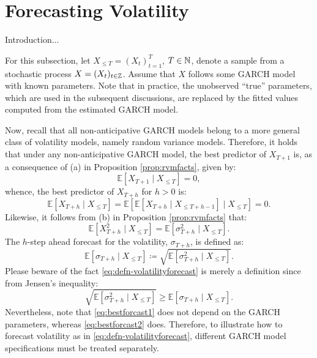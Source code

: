 \section{Forecasting Volatility}
Introduction... %

For this subsection, let $X_{\leq T}=(X_{t})_{t=1}^{T}$, $T\in\mathbb{N}$, denote a sample from a stochastic process $X=(X_{t})_{t\in\mathbb{Z}}$. Assume that $X$ follows some GARCH model with known parameters. Note that in practice, the unobserved ``true'' parameters, which are used in the subsequent discussions, are replaced by the fitted values computed from the estimated GARCH model.

Now, recall that all non-anticipative GARCH models belong to a more general class of volatility models, namely random variance models. Therefore, it holds that under any non-anticipative GARCH model, the best predictor of $X_{T+1}$ is, as a consequence of (a) in Proposition \ref{prop:rvmfacts}, given by: %
\begin{equation*}
    \mathbb{E}[X_{T+1}\mid X_{\leq T}]=0,
\end{equation*}
whence, the best predictor of $X_{T+h}$ for $h>0$ is:
\begin{equation}\label{eq:bestforcast1}
    \mathbb{E}[X_{T+h}\mid X_{\leq T}]=\mathbb{E}[\mathbb{E}[X_{T+h}\mid X_{\leq T+h-1}]\mid X_{\leq T}]=0.
\end{equation}
Likewise, it follows from (b) in Proposition \ref{prop:rvmfacts} that:
\begin{equation}\label{eq:bestforcast2}
    \mathbb{E}[X_{T+h}^{2}\mid X_{\leq T}]=\mathbb{E}[\sigma_{T+h}^{2}\mid X_{\leq T}].
\end{equation}
The $h$-step ahead forecast for the volatility, $\sigma_{T+h}$, is defined as:
\begin{equation}\label{eq:defn-volatilityforecast}
    \mathbb{E}[\sigma_{T+h}\mid X_{\leq T}]\coloneqq\sqrt{\mathbb{E}[\sigma_{T+h}^{2}\mid X_{\leq T}]}.
\end{equation}
Please beware of the fact \eqref{eq:defn-volatilityforecast} is merely a definition since from Jensen's inequality:
\begin{equation*}
    \sqrt{\mathbb{E}[\sigma_{T+h}^{2}\mid X_{\leq T}]}\geq\mathbb{E}[\sigma_{T+h}\mid X_{\leq T}].
\end{equation*}
Nevertheless, note that \eqref{eq:bestforcast1} does not depend on the GARCH parameters, whereas \eqref{eq:bestforcast2} does. 
Therefore, to illustrate how to forecast volatility as in \eqref{eq:defn-volatilityforecast}, different GARCH model specifications must be treated separately.

